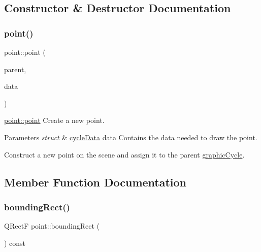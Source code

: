 \subsection{Constructor \& Destructor Documentation}
\mbox{\label{classpoint_a7284d568deda3fe4a7a81cf9faae05a3}} 
\subsubsection{\texorpdfstring{point()}{point()}}
{\footnotesize\ttfamily point\+::point (\begin{DoxyParamCaption}\item[{\mbox{\hyperlink{classgraphic_cycle}{graphic\+Cycle}} $\ast$}]{parent,  }\item[{struct \mbox{\hyperlink{structcycle_data}{cycle\+Data}}}]{data }\end{DoxyParamCaption})}



\mbox{\hyperlink{classpoint_a7284d568deda3fe4a7a81cf9faae05a3}{point\+::point}} Create a new point. 


\begin{DoxyParams}{Parameters}
{\em struct} & \mbox{\hyperlink{structcycle_data}{cycle\+Data}} data Contains the data needed to draw the point.\\
\hline
\end{DoxyParams}
Construct a new point on the scene and assign it to the parent \mbox{\hyperlink{classgraphic_cycle}{graphic\+Cycle}}. 

\subsection{Member Function Documentation}
\mbox{\label{classpoint_a91a81fc826052833e19e9d39ef3849d9}} 
\subsubsection{\texorpdfstring{bounding\+Rect()}{boundingRect()}}
{\footnotesize\ttfamily Q\+RectF point\+::bounding\+Rect (\begin{DoxyParamCaption}{ }\end{DoxyParamCaption}) const}



